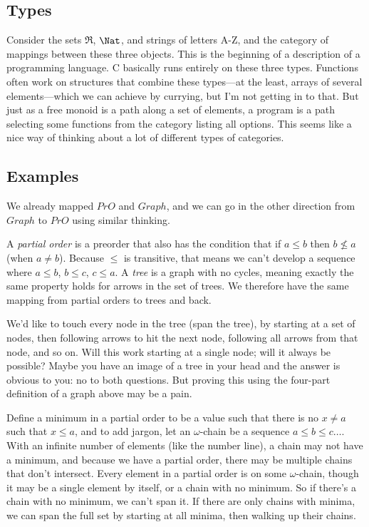 \documentclass[11pt]{article}
\begin{document}
\subsection{Types} Consider the sets $\Re$, $\Nat$, and strings of letters A-Z, and the
category of mappings between these three objects. This is the beginning of a description
of a programming language. C basically runs entirely on these three types. Functions often
work on structures that combine these types---at the least, arrays of several
elements---which we can achieve by currying, but I'm not getting in to that. But just as a
free monoid is a path along a set of elements, a program is a path selecting some
functions from the category listing all options. This seems like a nice way of thinking
about a lot of different types of categories.


\subsection{Examples} We already mapped $PrO$ and $Graph$, and we can go in the other
direction from $Graph$ to $PrO$ using similar thinking.

A {\em partial order} is a preorder that also has the condition that if $a\leq b$ then
$b\not\leq a$ (when $a\neq b$). Because $\leq$ is transitive, that means we can't
develop a sequence where $a\leq b$, $b\leq c$, $c\leq a$.
A {\em tree} is a graph with no cycles, meaning exactly the same property holds for arrows
in the set of trees. We therefore have the same mapping from partial orders to trees and
back.

We'd like to touch every node in the tree (span the tree), by starting at a set of
nodes, then following arrows to hit the next node, following all arrows from that node, and so on.
Will this work starting at a single node; will it always be possible? Maybe you have an
image of a tree in your head and the answer is obvious to you: no to both questions.
But proving this using the four-part definition of a graph above may be a pain.

Define a minimum in a partial order to be a value such that there is no $x\neq a$ such that
$x\leq a$, and to add jargon, let an $\omega$-chain be a sequence $a\leq b\leq
c\dots$. With an infinite number of elements (like the number line), a chain may not have
a minimum, and because we have a partial order, there may be multiple chains that don't
intersect. Every element in a partial order is on some $\omega$-chain, though it may be a
single element by itself, or a chain with no minimum. So if there's a chain with no
minimum, we can't span it.  If there are only chains with minima, we can span the full
set by starting at all minima, then walking up their chains.
\end{document}
